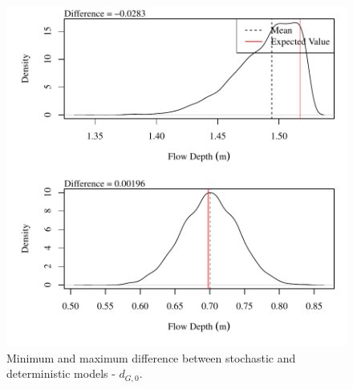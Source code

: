 \begin{center}
\begin{figure}[htbp]
	\includegraphics[width=6in]{"Figures/Results_DSR/V min-max diff depthG1"}
	\caption{Minimum and maximum difference between stochastic and deterministic models - $d_{G,0}$.}
\end{figure}
\end{center}
\newpage
